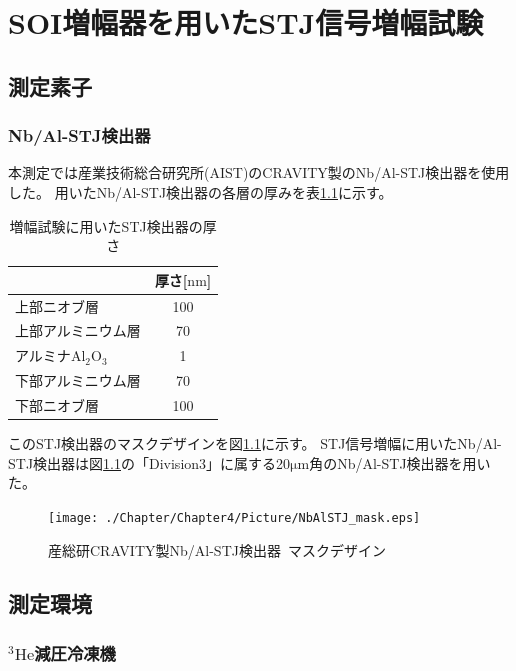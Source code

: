 \chapter{SOI増幅器を用いたSTJ信号増幅試験}
	\section{測定素子}
		\subsection{Nb/Al-STJ検出器}
			本測定では産業技術総合研究所(AIST)のCRAVITY製のNb/Al-STJ検出器を使用した。
			用いたNb/Al-STJ検出器の各層の厚みを表\ref{tab:NbAlSTJ_detail}に示す。
			\begin{table}[htb]
				\begin{center}
					\begin{tabular}{| l | c |} \hline
						\  & 厚さ[$\mathrm{nm}$] \\ \hline \hline
						上部ニオブ層 & 100 \\ \hline
						上部アルミニウム層 & 70 \\ \hline
						アルミナ$\mathrm{Al_{2}O_{3}}$ & 1 \\ \hline
						下部アルミニウム層 & 70 \\ \hline
						下部ニオブ層 & 100 \\ \hline
					\end{tabular}
					\caption{増幅試験に用いたSTJ検出器の厚さ}
					\label{tab:NbAlSTJ_detail}
				\end{center}
			\end{table}
			
			このSTJ検出器のマスクデザインを図\ref{fig:NbAlSTJ_mask}に示す。
			STJ信号増幅に用いたNb/Al-STJ検出器は図\ref{fig:NbAlSTJ_mask}の「Division3」に属する20$\mathrm{\mu m}$角のNb/Al-STJ検出器を用いた。
			
			\begin{figure}[htbp]
				\begin{center}
					\texttt{[image: ./Chapter/Chapter4/Picture/NbAlSTJ\_mask.eps]}
					\caption{産総研CRAVITY製Nb/Al-STJ検出器\ マスクデザイン}
					\label{fig:NbAlSTJ_mask}
				\end{center}
			\end{figure}
		
			\clearpage
	\section{測定環境}
		\subsection{$\mathrm{^{3}He}$減圧冷凍機}
